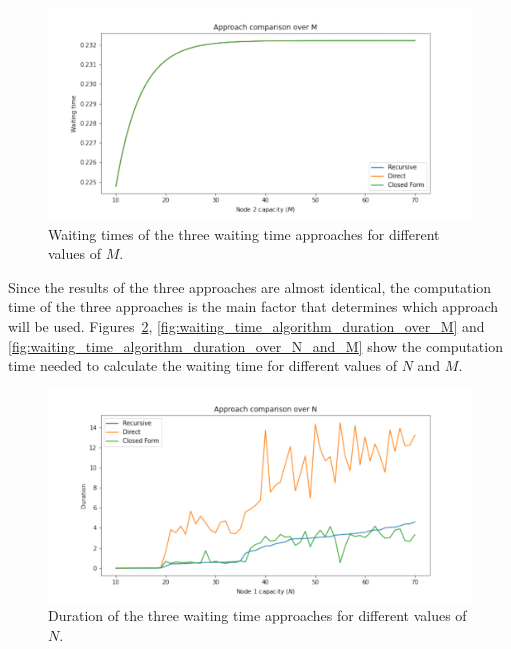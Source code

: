\begin{figure}[H]
    \includegraphics[width=\textwidth]{chapters/03_queueing_model/img/numeric_results_and_timings/waiting_time_formulas_comparison/waiting_time_over_M.pdf}
    \caption{Waiting times of the three waiting time approaches for different
    values of \(M\).}
    \label{fig:waiting_time_accuracy_over_M}
\end{figure}


Since the results of the three approaches are almost identical, the computation
time of the three approaches is the main factor that determines which
approach will be used.
Figures~\ref{fig:waiting_time_algorithm_duration_over_N}, 
\ref{fig:waiting_time_algorithm_duration_over_M} and 
\ref{fig:waiting_time_algorithm_duration_over_N_and_M} show the computation
time needed to calculate the waiting time for different values of \(N\) and
\(M\).

\begin{figure}[H]
    \includegraphics[width=\textwidth]{chapters/03_queueing_model/img/numeric_results_and_timings/waiting_time_formulas_comparison/algorithm_duration_over_N.pdf}
    \caption{Duration of the three waiting time approaches for different values
    of \(N\).}
    \label{fig:waiting_time_algorithm_duration_over_N}
\end{figure}

